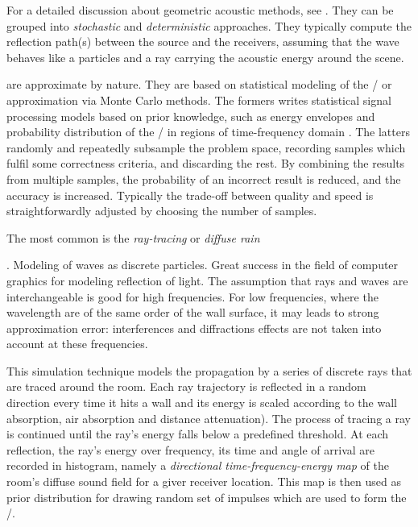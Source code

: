 For a detailed discussion about geometric acoustic methods, see \cite{Savioja2015goemetric}.
They can be grouped into \textit{stochastic} and \textit{deterministic} approaches.
They typically compute the reflection path(s) between the source and the receivers,
assuming that the wave behaves like a particles and a ray carrying the acoustic energy around the scene.

 are approximate by nature.
They are based on statistical modeling of the \RIRs/ or approximation via Monte Carlo methods.
The formers writes statistical signal processing models based on prior knowledge,
such as energy envelopes and probability distribution of the \RIR/ in regions of time-frequency domain  \cite{Badeau2019common}.
The latters randomly and repeatedly subsample the problem space, recording samples which fulfil some correctness criteria, and discarding the rest.
By combining the results from multiple samples, the probability of an incorrect result is reduced, and the accuracy is increased.
Typically the trade-off between quality and speed is straightforwardly adjusted by choosing the number of samples.

The most common is the \textit{ray-tracing}\cite{Kulowski1985algorithmic} or \textit{diffuse rain}\cite{Schroeder2007fast, Heinz1993binaural, Wabniz2010}

.
Modeling of waves as discrete particles.
Great success in the field of computer graphics for modeling reflection of light.
The assumption that rays and waves are interchangeable is good for high frequencies.
For low frequencies, where the wavelength are of the same order of the wall surface, it may leads to strong approximation error:
interferences and diffractions effects are not taken into account at these frequencies\cite{Savioja2015goemetric}.

This simulation technique models the propagation by a series of discrete rays that are traced around the room.
Each ray trajectory is reflected in a random direction every time it hits a wall and its energy is scaled according to the wall absorption, air absorption and distance attenuation).
The process of tracing a ray is continued until the ray’s energy falls below a predefined threshold.
At each reflection, the ray's energy over frequency, its time and angle of arrival are recorded in histogram, namely a
\textit{directional time-frequency-energy map} of the room’s diffuse sound field for a giver receiver location.
This map is then used as prior distribution for drawing random set of impulses which are used to form the \RIR/.

